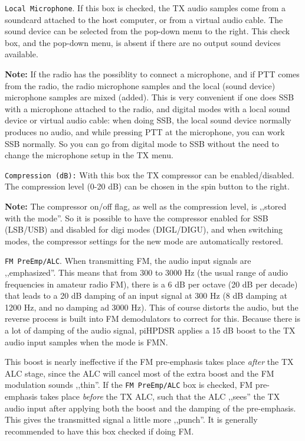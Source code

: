 \documentclass[12pt]{book}
\def\rett#1{\texttt{\color{red}#1}}
\begin{document}
\rett{Local Microphone}. If this box is checked, the TX audio samples come from a soundcard
attached to the host computer, or from a virtual audio cable. The sound device can be
selected from the pop-down menu to the right.
 This check box, and the pop-down menu, is absent if
there are no output sound devices available.

\textbf{Note:} If the radio has the possiblity
to connect a microphone, and if PTT comes from the radio, the radio microphone samples
and the local (sound device) microphone samples are mixed (added). This is very convenient
if one does SSB with a microphone attached to the radio, and digital modes with a
local sound device or virtual audio cable: when doing SSB, the local sound device normally
produces no audio, and while pressing PTT at the microphone, you can work SSB normally.
So you can go from digital mode to SSB without the need to change the microphone setup
in the TX menu.

\rett{Compression (dB):} With this box the TX compressor can be enabled/disabled.
The compression level (0-20 dB) can be chosen in the spin button to the right.

\textbf{Note:} The compressor on/off flag, as well as the compression level, is
,,stored with the mode''. So it is possible to have the compressor enabled for SSB
(LSB/USB)
and disabled for digi modes (DIGL/DIGU), and when switching modes, the compressor
settings for the new mode are automatically restored.

\rett{FM PreEmp/ALC}. When transmitting FM, the audio input signals are ,,emphasized''.
This means that from 300 to 3000 Hz (the usual range of audio frequencies in amateur
radio FM), there is a 6 dB per octave (20 dB per decade) that leads to a 20 dB damping
of an input signal at 300 Hz (8 dB damping at 1200 Hz, and no damping ad 3000 Hz).
This of course distorts the audio, but the reverse process is built into FM demodulators
to correct for this. Because there is a lot of damping of the audio signal, piHPDSR
applies a 15 dB boost to the TX audio input samples when the mode is FMN.

This boost is nearly ineffective if the FM pre-emphasis takes place \textit{after}
the TX ALC stage, since the ALC will cancel most of the extra boost and the FM
modulation sounds ,,thin''. If the \rett{FM PreEmp/ALC} box is checked, FM
pre-emphasis takes place \textit{before} the TX ALC, such that the ALC ,,sees''
the TX audio input after applying both the boost and the damping of the pre-emphasis. This gives the
transmitted signal a little more ,,punch''. It is generally recommended to have this box checked
if doing FM.
\end{document}

